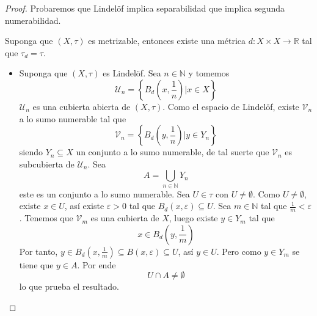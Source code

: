 \documentclass[12pt]{report}
\newcounter{it}
\theoremstyle{largebreak}
\newcommand\cf[3]{\ensuremath{#1:#2\rightarrow#3}}
\begin{document}
    \begin{proof}
        Probaremos que Lindelöf implica separabilidad que implica segunda numerabilidad.

        Suponga que $(X,\tau)$ es metrizable, entonces existe una métrica $\cf{d}{X\times X}{\mathbb{R}}$ tal que $\tau_d=\tau$.
        \begin{itemize}
            \item Suponga que $(X,\tau)$ es Lindelöf. Sea $n\in\mathbb{N}$ y tomemos
            \begin{equation*}
                \mathcal{U}_n=\left\{B_d\left(x,\frac{1}{n}\right) \Big|x\in X \right\}
            \end{equation*}
            $\mathcal{U}_n$ es una cubierta abierta de $(X,\tau)$. Como el espacio de Lindelöf, existe $\mathcal{V}_n$ a lo sumo numerable tal que
            \begin{equation*}
                \mathcal{V}_n=\left\{B_d\left(y,\frac{1}{n} \right)\Big|y\in Y_n \right\}
            \end{equation*}
            siendo $Y_n\subseteq X$ un conjunto a lo sumo numerable, de tal suerte que $\mathcal{V}_n$ es subcubierta de $\mathcal{U}_n$. Sea
            \begin{equation*}
                A=\bigcup_{n\in\mathbb{N}}Y_n
            \end{equation*}
            este es un conjunto a lo sumo numerable. Sea $U\in\tau$ con $U\neq\emptyset$. Como $U\neq\emptyset$, existe $x\in U$, así existe $\varepsilon>0$ tal que $B_d(x,\varepsilon)\subseteq U$. Sea $m\in\mathbb{N}$ tal que $\frac{1}{m}<\varepsilon$. Tenemos que $\mathcal{V}_m$ es una cubierta de $X$, luego existe $y\in Y_m$ tal que
            \begin{equation*}
                x\in B_d\left(y,\frac{1}{m}\right)
            \end{equation*}
            Por tanto, $y\in B_d\left(x,\frac{1}{m} \right)\subseteq B(x,\varepsilon)\subseteq U$, así $y\in U$. Pero como $y\in Y_m$ se tiene que $y\in A$. Por ende
            \begin{equation*}
                U\cap A\neq\emptyset
            \end{equation*}
            lo que prueba el resultado.


\end{itemize}
\end{proof}
\end{document}
